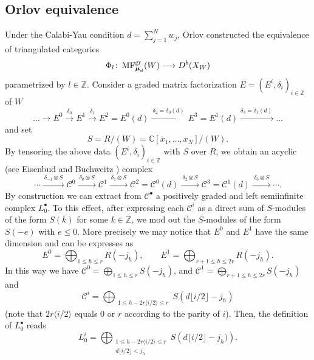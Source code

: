 \documentclass[11pt]{amsart}
\theoremstyle{definition} %
\theoremstyle{remark} %
\newcommand{\CC}{\mathbb C}
\newcommand{\ZZ}{\mathbb Z}
\newcommand{\Ccal}{\mathcal C}
\def\MFhom{\operatorname{{MF}}}
\newcommand{\bmu}{\boldsymbol{\mu}}
\newcommand{\ov}{\overline}
\begin{document}
\subsection{Orlov equivalence}
\label{subsec:Orlovequiv} 
Under the Calabi-Yau condition $d=\sum_{j=1}^N w_j$, 
Orlov \cite[Theorem 2.5]{Orlov:equivalence} 
constructed the equivalence of triangulated categories  
\begin{equation}
\Phi_l \colon \MFhom^{\rm gr}_{\bmu_d}(W)
\longrightarrow D^b(X_W)
\end{equation} 
parametrized by $l\in \ZZ$. 
Consider a graded matrix factorization 
$\ov{E}=(E^i,\delta_i)_{i\in \ZZ}$ of $W$ 
\[
\dots\to E^0\xrightarrow{\delta_0} E^1\xrightarrow{\delta_1} 
E^2=E^0(d)\xrightarrow{\ \delta_2=\delta_0(d)\ } 
E^3=E^1(d)\xrightarrow{\delta_3=\delta_1(d)\ }\dots
\]
and set 
\[
S=R/(W) = \CC[x_1,\dots,x_N]/(W). 
\]
By tensoring the above data $(E^i, \delta_i)_{i\in \ZZ}$ 
with $S$ over $R$, we obtain an acyclic 
(see Eisenbud \cite{Eis} and Buchweitz \cite{Buch}) 
complex 
\begin{equation*}
\cdots\xrightarrow{\ \delta_{-1}\otimes S\ } 
\Ccal^0\xrightarrow{\ \delta_0\otimes S\ } 
\Ccal^1\xrightarrow{\ \delta_1\otimes S\ }  
\Ccal^2=\Ccal^0(d)\xrightarrow{\ \delta_2\otimes S\ } 
\Ccal^3=\Ccal^1(d) \xrightarrow{\ \delta_3\otimes S\ }  
\cdots.                                    
\end{equation*} 
By construction we can extract from $\Ccal^\bullet$ 
a positively graded and left semiinfinite 
complex $L_0^\bullet$. 
To this effect, after expressing each $\Ccal^i$ 
as a direct sum of $S$-modules of the form $S(k)$ 
for some $k\in \ZZ$, 
we mod out the $S$-modules of the form $S(-e)$ with $e\le 0$. 
More precisely we may notice that 
$E^0$ and $E^1$ have the same dimension and 
can be expresses as  
\[
E^0=\bigoplus_{1\le h\le r} R(-j_h),\qquad 
E^1=\bigoplus_{r+1\le h\le 2r} R(-j_h).
\]
In this way we have 
$\Ccal^0=\bigoplus_{1\le h\le r} S(-j_h)$, 
and $\Ccal^1=\bigoplus_{r+1\le h\le 2r} S(-j_h)$ and 
\[
\Ccal^i=\bigoplus_{\substack{
{1\le h-2r\langle {i}/2\rangle\le r }}} 
S(d\lfloor i/2\rfloor -j_h)
\]
(note that $2r\langle i/2\rangle$ 
equals $0$ or $r$ according to the parity of $i$).
Then, the definition of $L_0^\bullet$ reads  
\begin{equation*}
L_0^i=\bigoplus_{\substack{{1\le h-2r\langle {i}/2\rangle\le r } 
\\{d\lfloor i/2\rfloor <j_{h}}}} 
S\left(d\lfloor i/2\rfloor -j_h)\right). 
\end{equation*}
\end{document}
